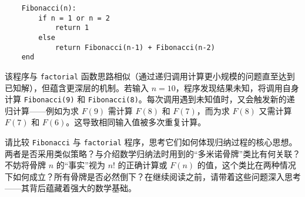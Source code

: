 \begin{verbatim}
    Fibonacci(n):
        if n = 1 or n = 2
            return 1
        else
            return Fibonacci(n-1) + Fibonacci(n-2)
    end
\end{verbatim}

该程序与 \verb|factorial| 函数思路相似（通过递归调用计算更小规模的问题直至达到已知解），但蕴含更深层的机制。若输入 $n = 10$，程序发现结果未知，将调用自身计算 \verb|Fibonacci(9)| 和 \verb|Fibonacci(8)|。每次调用遇到未知值时，又会触发新的递归计算——例如为求 $F(9)$ 需计算 $F(8)$ 和 $F(7)$，而为求 $F(8)$ 又需计算 $F(7)$ 和 $F(6)$。这导致相同输入值被多次重复计算。

请比较 \verb|Fibonacci| 与 \verb|factorial| 程序，思考它们如何体现归纳过程的核心思想。两者是否采用类似策略？与介绍数学归纳法时用到的``多米诺骨牌''类比有何关联？不妨将骨牌 $n$ 的``事实''视为 $n!$ 的正确计算或 $F(n)$ 的值，这个类比在两种情况下如何成立？所有骨牌是否必然倒下？在继续阅读之前，请带着这些问题深入思考——其背后蕴藏着强大的数学基础。

\clearpage

